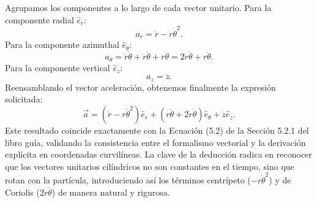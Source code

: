 \documentclass[12pt, a4paper]{article}
\begin{document}
Agrupamos los componentes a lo largo de cada vector unitario. Para la componente radial $\hat{e}_r$:
$$
a_r = \ddot{r} - r\dot{\theta}^2.
$$
Para la componente azimuthal $\hat{e}_\theta$:
$$
a_\theta = \dot{r}\dot{\theta} + \dot{r}\dot{\theta} + r\ddot{\theta} = 2\dot{r}\dot{\theta} + r\ddot{\theta}.
$$
Para la componente vertical $\hat{e}_z$:
$$
a_z = \ddot{z}.
$$
Reensamblando el vector aceleración, obtenemos finalmente la expresión solicitada:
$$
\vec{a} = (\ddot{r} - r\dot{\theta}^2)\hat{e}_r + (r\ddot{\theta} + 2\dot{r}\dot{\theta})\hat{e}_\theta + \ddot{z}\hat{e}_z.
$$
Este resultado coincide exactamente con la Ecuación (5.2) de la Sección 5.2.1 del libro guía, validando la consistencia entre el formalismo vectorial y la derivación explícita en coordenadas curvilíneas. La clave de la deducción radica en reconocer que los vectores unitarios cilíndricos no son constantes en el tiempo, sino que rotan con la partícula, introduciendo así los términos centrípeto ($-r\dot{\theta}^2$) y de Coriolis ($2\dot{r}\dot{\theta}$) de manera natural y rigurosa.
\end{document}

